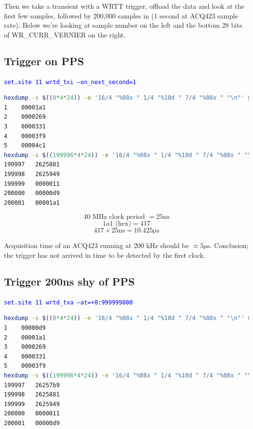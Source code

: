 \documentclass[]{article}
\begin{document}
Then we take a transient with a WRTT trigger, offload the data and look at the first few samples, followed by 200,000 samples in (1 second at ACQ423 sample rate). Below we're looking at sample number on the left and the bottom 28 bits of WR\_CURR\_VERNIER on the right.\\

\subsection{Trigger on PPS}

\textcolor{blue}{\texttt{set.site 11 wrtd\_txi --on\_next\_second=1}}

\begin{center}\begin{lstlisting}[language=bash,style=octavestyle]
hexdump -s $((0*4*24)) -e '16/4 "%08x " 1/4 "%10d " 7/4 "%08x " "\n"' shot_data | head -5 | awk '{ print $17,"\t",substr($19,2,16)}'
1 	 00001a1
2 	 0000269
3 	 0000331
4 	 00003f9
5 	 00004c1
hexdump -s $((199996*4*24)) -e '16/4 "%08x " 1/4 "%10d " 7/4 "%08x " "\n"' shot_data | head -5 | awk '{ print $17,"\t",substr($19,2,16)}'
199997 	 2625881
199998 	 2625949
199999 	 0000011
200000 	 00000d9
200001 	 00001a1
\end{lstlisting}\end{center}

\[	\textrm{40 MHz clock period }= 25\si{\ns}	\]
\[	1a1\textrm{ (hex)}= 417	\]
\[	417 \times 25 \si{\ns} = 10.425\si{\us}	\]

Acquisition time of an ACQ423 running at 200 kHz should be $\approx 5 \si{\us}$. Conclusion; the trigger has not arrived in time to be detected by the first clock.

\subsection{Trigger 200ns shy of PPS}

\textcolor{blue}{\texttt{set.site 11 wrtd\_txa --at=+0:999999800}}

\begin{center}\begin{lstlisting}[language=bash,style=octavestyle]
hexdump -s $((0*4*24)) -e '16/4 "%08x " 1/4 "%10d " 7/4 "%08x " "\n"' shot_data | head -5 | awk '{ print $17,"\t",substr($19,2,16)}'
1 	 00000d9
2 	 00001a1
3 	 0000269
4 	 0000331
5 	 00003f9
hexdump -s $((199996*4*24)) -e '16/4 "%08x " 1/4 "%10d " 7/4 "%08x " "\n"' shot_data | head -5 | awk '{ print $17,"\t",substr($19,2,16)}'
199997 	 26257b9
199998 	 2625881
199999 	 2625949
200000 	 0000011
200001 	 00000d9
\end{lstlisting}\end{center}
\end{document}

